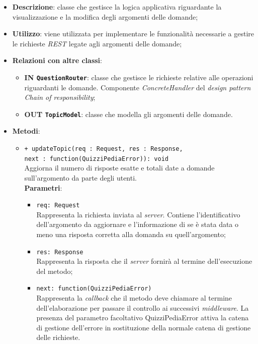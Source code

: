 \begin{itemize}
	\item \textbf{Descrizione}:
	classe che gestisce la logica applicativa riguardante la visualizzazione e la modifica degli argomenti delle domande;
	\item \textbf{Utilizzo}:
	viene utilizzata per implementare le funzionalità necessarie a gestire le richieste \textit{REST} legate agli argomenti delle domande;
	\item \textbf{Relazioni con altre classi}:
		\begin{itemize}
			\item \textbf{IN \texttt{QuestionRouter}}:
			classe che gestisce le richieste relative alle operazioni riguardanti le domande. Componente \textit{ConcreteHandler} del \textit{design pattern} \textit{Chain of responsibility};
			\item \textbf{OUT \texttt{TopicModel}}: 
			classe che modella gli argomenti delle domande.
		\end{itemize}
	\item \textbf{Metodi}:
		\begin{itemize}
			\item \texttt{+ updateTopic(req : Request, res : Response, \\next : function(QuizziPediaError)): void} \\
			Aggiorna il numero di risposte esatte e totali date a domande sull'argomento da parte degli utenti. \\
			\textbf{Parametri}:
			\begin{itemize}
			\item \texttt{req: Request} \\
			Rappresenta la richiesta inviata al \textit{server}. Contiene l'identificativo dell'argomento da aggiornare e l'informazione di se è stata data o meno una risposta corretta alla domanda su quell'argomento;
			\item \texttt{res: Response} \\
			Rappresenta la risposta che il \textit{server} fornirà al termine dell'esecuzione del metodo;
			\item \texttt{next: function(QuizziPediaError)} \\
			Rappresenta la \textit{callback} che il metodo deve chiamare al termine dell'elaborazione per passare il controllo ai successivi \textit{middleware}. La presenza del parametro facoltativo QuizziPediaError attiva la catena di gestione dell'errore in sostituzione della normale catena di gestione delle richieste.

\end{itemize}
\end{itemize}
\end{itemize}
